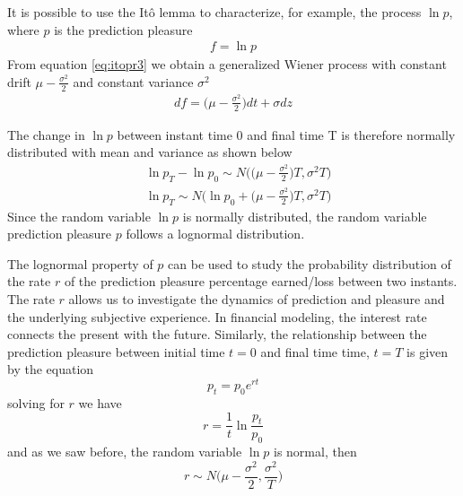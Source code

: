 \documentclass[11pt,twocolumn]{article}
\begin{document}
It is possible to use the  It\^{o} lemma to characterize, for example, the process $\ln p$, where $p$ is the prediction pleasure
\begin{equation}
\begin{split}
  f = \ln p
\end{split}
\label{eq:slns}
\end{equation} 
From equation \ref{eq:itopr3} we obtain a generalized Wiener process with constant drift $\mu - \frac{\sigma^2}{2}$ and constant variance $\sigma^2$ 
\begin{equation*}
\begin{split}
df =  \bigg( \mu - \frac{\sigma^2}{2} \bigg)dt + \sigma dz
\end{split}
\label{eq:slns2}
\end{equation*} 

The change in $\ln p $ between instant time 0 and final time T is therefore normally distributed with mean and variance as shown below
\begin{equation*}
\begin{split}
 & \ln p_T - \ln p_0 \sim N \bigg( \big(\mu - \frac{\sigma ^2}{2} \big) T, \sigma^2 T \bigg) \\
 & \ln p_T  \sim N \bigg( \ln p_0 + \big(\mu - \frac{\sigma ^2}{2} \big) T, \sigma^2 T \bigg) 
\end{split}
\label{eq:slns3}
\end{equation*}
Since the random variable $\ln p$ is normally distributed, the random variable  prediction pleasure $p$ follows a lognormal distribution. 
%
%

The lognormal property of $p$ can be used to study the
probability distribution of the rate $r$ of the prediction pleasure percentage earned/loss between two instants. The rate $r$ allows us to investigate the dynamics of prediction and pleasure and the underlying subjective experience. 
In financial modeling, the interest rate connects the present with the future. Similarly, the relationship between the prediction pleasure between initial time $t = 0$ and final time time, $t=T$ is given by the equation
\begin{equation*}
   p_t = p_0 e^{r t}
\label{eq:vpbpt}
\end{equation*}
solving for $r$ we have
\begin{equation*}
   r = \frac{1}{t}\ln \frac{p_t}{p_0}
\label{eq:vpbpt2}
\end{equation*}
and as we saw before, the random variable $\ln p$ is normal, then   
\begin{equation}
   r \sim  N \bigg( \mu - \frac{\sigma ^2}{2} , \frac{\sigma^2}{T} \bigg) 
\label{eq:vpbpt3}
\end{equation}
\end{document}
